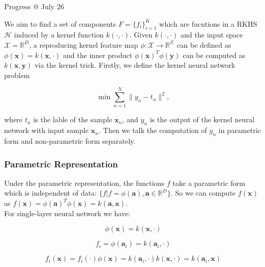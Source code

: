 \documentclass{article}
\begin{document}
\newpage
\LARGE Progress @ July 26\normalsize\vspace{3ex}

\par We aim to find a set of components $F = \{f_i\}_{i=1}^{K}$ which are fucntions in a RKHS $\mathcal{H}$ induced by a kernel function $k(\cdot, \cdot)$. Given $k(\cdot, \cdot)$ and the input space $\mathcal{X} = \mathbb{R}^D$, a reproducing kernel feature map \cite{scholkopf2002learning} $\phi: \mathcal{X}\rightarrow\mathbb{R}^\mathcal{X}$ can be defined as $\phi(\mathbf{x}) = k(\mathbf{x}, \cdot)$ and the inner product $\phi(\mathbf{x})^{T}\phi(\mathbf{y})$ can be computed as $k(\mathbf{x}, \mathbf{y})$ via the kernel trick.
Firstly, we define the kernel neural network problem

\begin{equation}
\min\sum_{n=1}^{N}\|y_n - t_n\|^2,
\end{equation}

where $t_n$ is the lable of the sample $\mathbf{x}_n$, and $y_n$ is the output of the kernel neural network with input sample $\mathbf{x}_n$. Then we talk the computation of $y_n$ in parametric form and non-parametric form separately.

\subsubsection{Parametric Representation}
Under the parametric representation, the functions $f$ take a parametric form which is independent of data: $\{f|f = \phi(\mathbf{a}), \mathbf{a}\in \mathbb{R}^D\}$. So we can compute $f(\mathbf{x})$ as $f(\mathbf{x}) = \phi(\mathbf{a})^T \phi(\mathbf{x}) = k(\mathbf{a}, \mathbf{x})$.\\

For single-layer neural network we have:

\begin{equation}
\phi(\mathbf{x}) = k(\mathbf{x},\cdot)
\end{equation}

\begin{equation}
f_i = \phi(\mathbf{a}_i) = k(\mathbf{a}_i,\cdot)
\end{equation}

\begin{equation}
f_i(\mathbf{x}) = f_i(\cdot)\phi(\mathbf{x}) = k(\mathbf{a}_i,\cdot) k(\mathbf{x},\cdot) = k(\mathbf{a}_i,\mathbf{x})
\end{equation}
\end{document}
